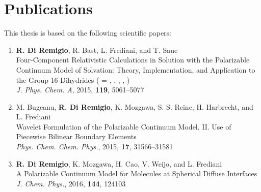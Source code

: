 \thispagestyle{empty}
\chapter*{Publications}%

This thesis is based on the following scientific papers:

\begin{enumerate}[label=\textbf{\Roman{*} },ref=\Roman{*}]

\item
  \textbf{R. Di Remigio}, R. Bast, L. Frediani, and T. Saue
  \\
  Four-Component Relativistic Calculations in Solution with the
  Polarizable Continuum Model of Solvation: Theory,
  Implementation, and Application to the Group 16 Dihydrides
   ( = , , , ,
  )
  \\
\textit{J. Phys. Chem. A}, \textrm{2015}, \textbf{119}, 5061--5077
\label{relapcm}

\item
  M. Bugeanu, \textbf{R. Di Remigio}, K. Mozgawa, S. S. Reine, H.
  Harbrecht,  and L. Frediani
  \\
  Wavelet Formulation of the Polarizable Continuum Model. II. Use of
  Piecewise Bilinear Boundary Elements
  \\
  \textit{Phys. Chem. Chem. Phys.}, \textrm{2015}, \textbf{17},
  31566--31581
\label{wemlin}

\item
  \textbf{R. Di Remigio}, K. Mozgawa, H. Cao, V. Weijo, and L.
  Frediani
  \\
  A Polarizable Continuum Model for Molecules at Spherical
  Diffuse Interfaces
  \\
  \textit{J. Chem. Phys.}, \textrm{2016}, \textbf{144}, 124103
\label{spherical}

\end{enumerate}
